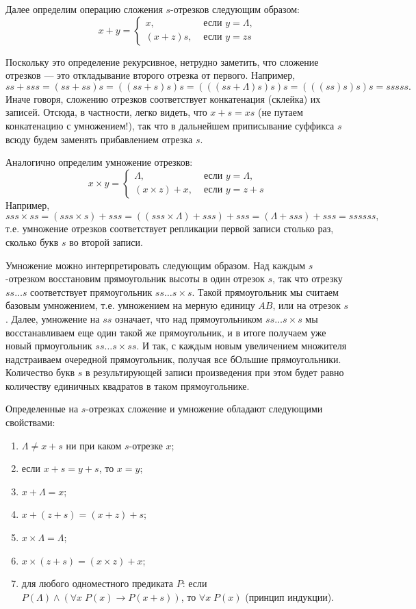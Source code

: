 Далее определим операцию сложения $s$-отрезков следующим образом:
$$
x+y = 
\begin{cases}
x, & \mbox{ если }y=\Lambda,\\
(x+z)s, & \mbox{ если }y=zs
\end{cases}
$$

Поскольку это определение рекурсивное, нетрудно заметить, что сложение отрезков --- это откладывание второго отрезка от первого. Например,
$$
ss+sss = (ss+ss)s = ((ss+s)s)s = (((ss+\Lambda)s)s)s = (((ss)s)s)s = sssss.
$$
Иначе говоря, сложению отрезков соответствует конкатенация (склейка) их записей. Отсюда, в частности, легко видеть, что $x+s=xs$ (не путаем конкатенацию с умножением!), так что в дальнейшем приписывание суффикса $s$ всюду будем заменять прибавлением отрезка $s$.

Аналогично определим умножение отрезков:
$$
x\times y = 
\begin{cases}
\Lambda, & \mbox{ если }y=\Lambda,\\
(x\times z) + x, & \mbox{ если }y=z+s
\end{cases}
$$
Например,
$$
sss\times ss = (sss\times s) + sss = ((sss\times\Lambda) + sss)+sss = (\Lambda + sss) + sss=ssssss,
$$
т.е. умножение отрезков соответствует репликации первой записи столько раз, сколько букв $s$ во второй записи.


Умножение можно интерпретировать следующим образом. Над каждым $s$-отрезком восстановим прямоугольник высоты в один отрезок $s$, так что отрезку $ss\dots s$ соответствует прямоугольник $ss\dots s\times s$. Такой прямоугольник мы считаем базовым умножением, т.е. умножением на мерную единицу $AB$, или на отрезок $s$. Далее, умножение на $ss$ означает, что над прямоугольником $ss\dots s\times s$ мы восстанавливаем еще один такой же прямоугольник, и в итоге получаем уже новый прмоугольник $ss\dots s\times ss$. И так, с каждым новым увеличением множителя надстраиваем очередной прямоугольник, получая все бОльшие прямоугольники. Количество букв $s$ в результирующей записи произведения при этом будет равно количеству единичных квадратов в таком прямоугольнике.


Определенные на $s$-отрезках сложение и умножение обладают следующими свойствами:
\begin{enumerate}[I]
\item $\Lambda\ne x+s$ ни при каком $s$-отрезке $x$;
\item если $x+s=y+s$, то $x=y$;
\item $x+\Lambda=x$;
\item $x+(z+s)=(x+z)+s$;
\item $x\times \Lambda=\Lambda$;
\item $x\times(z+s)=(x\times z)+x$;
\item для любого одноместного предиката $P$: если $P(\Lambda)\land(\forall x \; P(x)\to P(x+s))$, то $\forall x\; P(x)$ (принцип индукции).
\end{enumerate}

